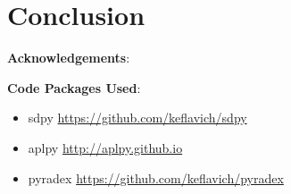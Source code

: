 \section{Conclusion}


\textbf{Acknowledgements}:

\textbf{Code Packages Used}:

\begin{itemize}
    \item sdpy \url{https://github.com/keflavich/sdpy}
    \item aplpy \url{http://aplpy.github.io}
    \item pyradex \url{https://github.com/keflavich/pyradex}
\end{itemize}





